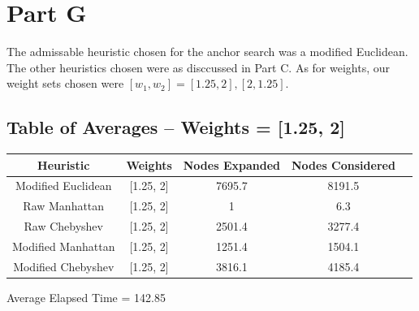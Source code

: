 \documentclass[12pt]{article}
\begin{document}
\section{Part G}
The admissable heuristic chosen for the anchor search was a modified Euclidean. The other heuristics chosen were as disccussed in Part C. As for weights, our weight sets chosen were \([w_1,w_2] = [1.25,2],[2,1.25]\).

\subsection{Table of Averages -- Weights = [1.25, 2]}
\begin{tabular}{|c|c|c|c|c|}
\hline
	Heuristic & Weights & Nodes Expanded & Nodes Considered\\
\hline
	Modified Euclidean & [1.25, 2] & 7695.7 & 8191.5\\
\hline
	Raw Manhattan & [1.25, 2] & 1 & 6.3\\
\hline
	Raw Chebyshev & [1.25, 2] & 2501.4 & 3277.4\\
\hline
	Modified Manhattan & [1.25, 2] & 1251.4 & 1504.1\\
\hline
	Modified Chebyshev & [1.25, 2] & 3816.1 & 4185.4\\
\hline
\end{tabular}
\newline
Average Elapsed Time = 142.85
\end{document}
